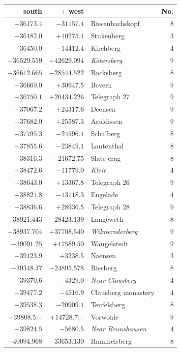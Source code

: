 \clearpage{}%
\begin{center}\begingroup\fontsize{8}{9}\selectfont
\setlength{\tabcolsep}{4pt}
\begin{tabular}{r|r|p{170pt}|r}\hline
\(+\) south&\(+\) west&&No.\\\hline
\(-36173.4\)&\(-31157.4\)&Riesenbachskopf&\(8\)\\
\(-36182.0\)&\(+10275.4\)&Stukenberg&\(3\)\\
\(-36450.0\)&\(-14412.4\)&Kirchberg&\(4\)\\
\(-36529.559\)&\(+42629.094\)&\textit{Kötersberg}&\(9\)\\
\(-36612.665\)&\(-28544.522\)&Bocksberg&\(8\)\\
\(-36669.0\)&\(+30947.5\)&Bevern&\(9\)\\
\(-36750.1\)&\(+20434.226\)&Telegraph 27&\(9\)\\
\(-37067.2\)&\(+24317.6\)&Deensen&\(9\)\\
\(-37682.0\)&\(+25587.3\)&Aroldissen&\(9\)\\
\(-37795.3\)&\(-24596.4\)&Schulberg&\(8\)\\
\(-37855.6\)&\(-23849.1\)&Lautenthal&\(8\)\\
\(-38316.3\)&\(-21672.75\)&Slate crag&\(8\)\\
\(-38472.6\)&\(-11779.0\)&\textit{Kleie}&\(4\)\\
\(-38643.0\)&\(+13367.8\)&Telegraph 26&\(9\)\\
\(-38821.8\)&\(-13118.3\)&Engelade&\(4\)\\
\(-38836.6\)&\(+28936.5\)&Telegraph 28&\(9\)\\
\(-38921.443\)&\(-28423.139\)&Langeweth&\(8\)\\
\(-38937.704\)&\(+37708.540\)&\textit{Wilmeroderberg}&\(9\)\\
\(-39091.25\)&\(+17589.50\)&Wangelstedt&\(9\)\\
\(-39123.9\)&\(+3238.5\)&Naensen&\(3\)\\
\(-39348.37\)&\(-24895.578\)&Riesberg&\(8\)\\
\(-39370.6\)&\(-4329.0\)&\textit{Near Clausberg}&\(4\)\\
\(-39477.2\)&\(-4516.9\)&Clausberg monastery&\(4\)\\
\(-39538.3\)&\(-20909.1\)&Teufelsberg&\(8\)\\
\(-39808.5::\)&\(+14728.7::\)&Vorwohle&\(9\)\\
\(-39824.5\)&\(-5680.5\)&\textit{Near Brunshausen}&\(4\)\\
\(-40094.968\)&\(-33653.130\)&Rammelsberg&\(8\)\\

\end{tabular}
\end{center}
